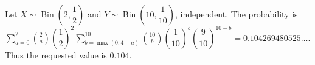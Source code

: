 Let $X\sim\operatorname{Bin}(2,\dfrac{1}{2})$ and $Y\sim\operatorname{Bin}(10,\dfrac{1}{10})$, independent. The probability is $\sum_{a=0}^2\binom2a(\dfrac{1}{2})^2\sum_{b=\max(0,4-a)}^{10}\binom{10}{b}(\dfrac{1}{10})^b(\dfrac{9}{10})^{10-b}=0.104269480525\ldots$. Thus the requested value is $\boxed{0.104}$.
